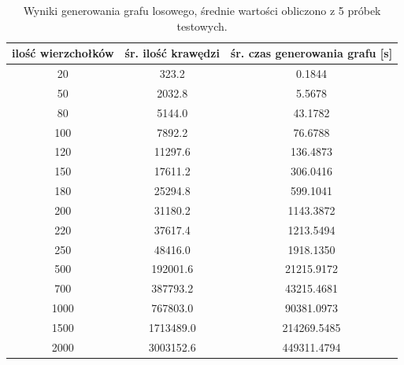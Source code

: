 \documentclass[a4paper, 12pt, twoside, openright]{article}
\begin{document}
\begin{table}[!p]
	\centering
	\caption{Wyniki generowania grafu losowego, średnie wartości obliczono z 5 próbek testowych.}
	
	\resizebox{16cm}{!}
	{
		\begin{tabular}{|c c c|}
			\hline
			ilość wierzchołków	& śr. ilość krawędzi 		& śr. czas generowania grafu [s]\\ \hline \hline
			20 	& 323.2  		& 0.1844 	\\ \hline
			50 	& 2032.8 		& 5.5678 	\\ \hline
			80 	& 5144.0        & 43.1782	\\ \hline
			100 & 7892.2        & 76.6788	\\ \hline
			120 & 11297.6       & 136.4873	\\ \hline
			150 & 17611.2 		& 306.0416	\\ \hline
			180 & 25294.8       & 599.1041	\\ \hline
			200 & 31180.2  		& 1143.3872	\\ \hline
			220 & 37617.4 		& 1213.5494	\\ \hline
			250 & 48416.0   	& 1918.1350	\\ \hline
			500 & 192001.6   	& 21215.9172\\ \hline				
			700 & 387793.2		& 43215.4681\\ \hline
			1000& 767803.0	    & 90381.0973\\ \hline
			1500& 1713489.0    	& 214269.5485\\ \hline			
			2000& 3003152.6	  	& 449311.4794\\ \hline
		\end{tabular} 
	}
	\label{Tab:gen_DiG}
\end{table}
\end{document}
